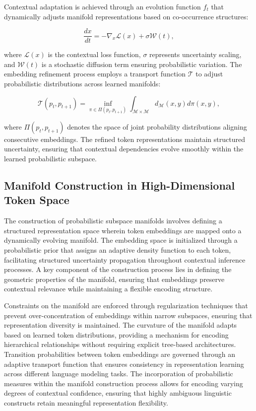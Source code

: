 \documentclass{article}
\begin{document}
Contextual adaptation is achieved through an evolution function \( f_t \) that dynamically adjusts manifold representations based on co-occurrence structures:

\begin{equation}
	\frac{d x}{d t} = - \nabla_x \mathcal{L}(x) + \sigma \mathcal{W}(t),
\end{equation}

where \( \mathcal{L}(x) \) is the contextual loss function, \( \sigma \) represents uncertainty scaling, and \( \mathcal{W}(t) \) is a stochastic diffusion term ensuring probabilistic variation. The embedding refinement process employs a transport function \( \mathcal{T} \) to adjust probabilistic distributions across learned manifolds:

\begin{equation}
	\mathcal{T}(p_t, p_{t+1}) = \inf_{\pi \in \Pi(p_t, p_{t+1})} \int_{\mathcal{M} \times \mathcal{M}} d_{\mathcal{M}}(x, y) d\pi(x, y),
\end{equation}

where \( \Pi(p_t, p_{t+1}) \) denotes the space of joint probability distributions aligning consecutive embeddings. The refined token representations maintain structured uncertainty, ensuring that contextual dependencies evolve smoothly within the learned probabilistic subspace.







\subsection{Manifold Construction in High-Dimensional Token Space}

The construction of probabilistic subspace manifolds involves defining a structured representation space wherein token embeddings are mapped onto a dynamically evolving manifold. The embedding space is initialized through a probabilistic prior that assigns an adaptive density function to each token, facilitating structured uncertainty propagation throughout contextual inference processes. A key component of the construction process lies in defining the geometric properties of the manifold, ensuring that embeddings preserve contextual relevance while maintaining a flexible encoding structure.

Constraints on the manifold are enforced through regularization techniques that prevent over-concentration of embeddings within narrow subspaces, ensuring that representation diversity is maintained. The curvature of the manifold adapts based on learned token distributions, providing a mechanism for encoding hierarchical relationships without requiring explicit tree-based architectures. Transition probabilities between token embeddings are governed through an adaptive transport function that ensures consistency in representation learning across different language modeling tasks. The incorporation of probabilistic measures within the manifold construction process allows for encoding varying degrees of contextual confidence, ensuring that highly ambiguous linguistic constructs retain meaningful representation flexibility.
\end{document}
